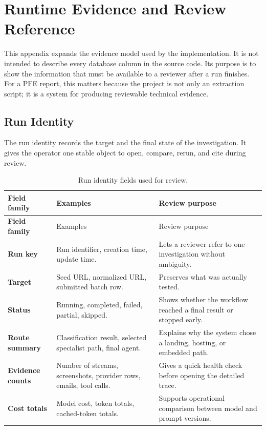 \chapter{Runtime Evidence and Review Reference}
\label{app:runtime-reference}

This appendix expands the evidence model used by the implementation. It is not
intended to describe every database column in the source code. Its purpose is to
show the information that must be available to a reviewer after a run finishes.
For a PFE report, this matters because the project is not only an extraction
script; it is a system for producing reviewable technical evidence.

\section{Run Identity}

The run identity records the target and the final state of the investigation.
It gives the operator one stable object to open, compare, rerun, and cite during
review.

\begin{longtable}{>{\raggedright\arraybackslash\bfseries}p{3.7cm}
                  >{\raggedright\arraybackslash}p{4.3cm}
                  >{\raggedright\arraybackslash}p{5.7cm}}
\caption{Run identity fields used for review.}
\label{tab:runtime-run-identity}\\
\toprule
\rowcolor{accent!8}
Field family & Examples & Review purpose \\
\midrule
\endfirsthead
\toprule
\rowcolor{accent!8}
Field family & Examples & Review purpose \\
\midrule
\endhead
\bottomrule
\endfoot
Run key & Run identifier, creation time, update time. & Lets a reviewer refer
to one investigation without ambiguity. \\
Target & Seed URL, normalized URL, submitted batch row. & Preserves what was
actually tested. \\
Status & Running, completed, failed, partial, skipped. & Shows whether the
workflow reached a final result or stopped early. \\
Route summary & Classification result, selected specialist path, final agent. &
Explains why the system chose a landing, hosting, or embedded path. \\
Evidence counts & Number of streams, screenshots, provider rows, emails, tool
calls. & Gives a quick health check before opening the detailed trace. \\
Cost totals & Model cost, token totals, cached-token totals. & Supports
operational comparison between model and prompt versions. \\
\end{longtable}

